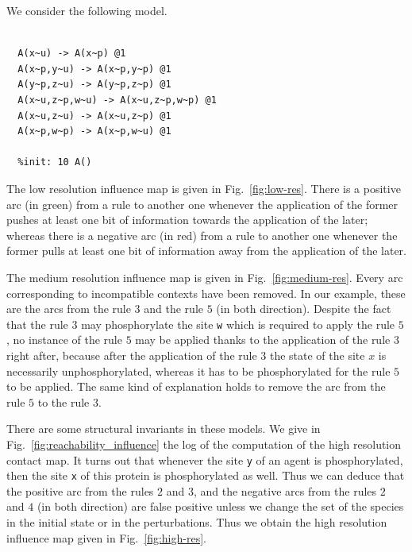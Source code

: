\documentclass[11pt]{book}
\begin{document}
We consider the following model.
\begin{lstlisting}[language=kappa]
  %agent: A(w~u~p,x~u~p,y~u~p,z~u~p)

  A(x~u) -> A(x~p) @1
  A(x~p,y~u) -> A(x~p,y~p) @1
  A(y~p,z~u) -> A(y~p,z~p) @1
  A(x~u,z~p,w~u) -> A(x~u,z~p,w~p) @1
  A(x~u,z~u) -> A(x~u,z~p) @1
  A(x~p,w~p) -> A(x~p,w~u) @1

  %init: 10 A()
\end{lstlisting}

The low resolution influence map is given in Fig.~\ref{fig:low-res}.
There is a positive arc (in green) from a rule to another one whenever the application of the former pushes at least one bit of information towards the application of the later; whereas there is a negative arc (in red) from a rule to another one whenever the former pulls at least one bit of information away from the application of the later.

The medium resolution influence map is given in Fig.~\ref{fig:medium-res}.
Every arc corresponding to incompatible contexts have been removed.
In our example, these are the arcs from the rule $3$ and the rule $5$ (in both direction). Despite the fact that the rule $3$ may phosphorylate the site \texttt{w} which is required to apply the rule $5$, no instance of the rule $5$ may be applied thanks to the application of the rule $3$ right after, because after the application of the rule $3$ the state of the site $x$ is necessarily unphosphorylated, whereas it has to be phosphorylated for the rule $5$ to be applied. The same kind of explanation holds to remove the arc from the rule $5$ to the rule $3$.

There are some structural invariants in these models. We give in Fig.~\ref{fig:reachability_influence} the log of the computation of the high resolution contact map. It turns out that whenever the site \texttt{y} of an agent is phosphorylated, then the site \texttt{x} of this protein is phosphorylated as well. Thus we can deduce that the positive arc from the rules $2$ and $3$, and the negative arcs from the rules $2$ and $4$ (in both direction) are false positive unless we change the set of the species in the initial state or in the perturbations. Thus we obtain the high resolution influence map given in Fig.~\ref{fig:high-res}.
\end{document}
